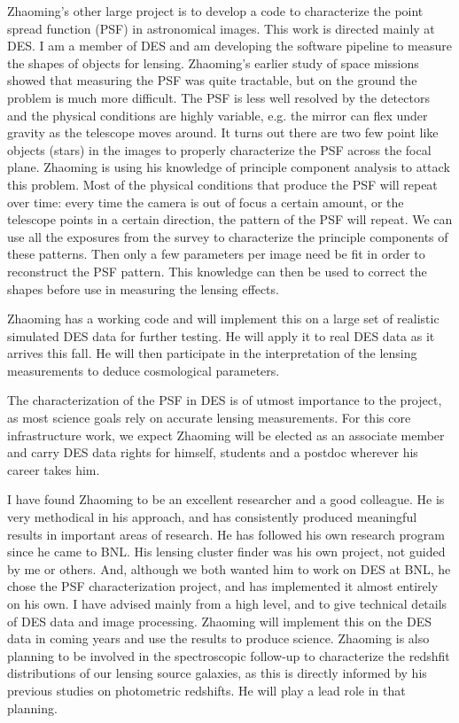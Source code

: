 \documentclass[12pt]{letter}
\begin{document}
\begin{letter}{}
Zhaoming's other large project is to develop a code to characterize the point
spread function (PSF) in astronomical images.  This work is directed mainly at
DES.  I am a member of DES and am developing the software pipeline to measure
the shapes of objects for lensing.  Zhaoming's earlier study of space missions
showed that measuring the PSF was quite tractable, but on the ground the
problem is much more difficult.  The PSF is less well resolved by the detectors
and the physical conditions are highly variable, e.g. the mirror can flex under
gravity as the telescope moves around.  It turns out there are two few point
like objects (stars) in the images to properly characterize the PSF across the
focal plane.  Zhaoming is using his knowledge of principle component analysis
to attack this problem.  Most of the physical conditions that produce the PSF
will repeat over time: every time the camera is out of focus a certain amount,
or the telescope points in a certain direction, the pattern of the PSF will
repeat. We can use all the exposures from the survey to characterize the
principle components of these patterns.  Then only a few parameters per image
need be fit in order to reconstruct the PSF pattern.  This knowledge can then
be used to correct the shapes before use in measuring the lensing effects.

Zhaoming has a working code and will implement this on a large set of realistic
simulated DES data for further testing. He will apply it to real DES data as it
arrives this fall.  He will then participate in the interpretation of the
lensing measurements to deduce cosmological parameters.

The characterization of the PSF in DES is of utmost importance to the project,
as most science goals rely on accurate lensing measurements.  For this core
infrastructure work, we expect Zhaoming will be elected as an associate member
and carry DES data rights for himself, students and a postdoc wherever his
career takes him.

I have found Zhaoming to be an excellent researcher and a good colleague.  He
is very methodical in his approach, and has consistently produced meaningful
results in important areas of research.  He has followed his own research
program since he came to BNL.  His lensing cluster finder was his own project,
not guided by me or others.  And, although we both wanted him to work on DES at
BNL, he chose the PSF characterization project, and has implemented it almost
entirely on his own.  I have advised mainly from a high level, and to give
technical details of DES data and image processing.  Zhaoming will implement
this on the DES data in coming years and use the results to produce science.
Zhaoming is also planning to be involved in the spectroscopic follow-up to
characterize the redshfit distributions of our lensing source galaxies, as this
is directly informed by his previous studies on photometric redshifts.  He will
play a lead role in that planning.


\end{letter}
\end{document}
